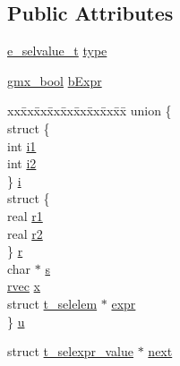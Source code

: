 \subsection*{\-Public \-Attributes}
\begin{DoxyCompactItemize}
\item 
\hyperlink{include_2selvalue_8h_a70b42b87d434580bf1493591857b8bec}{e\-\_\-selvalue\-\_\-t} \hyperlink{structt__selexpr__value_a04bb5634ea528c40b60aabdf39548897}{type}
\item 
\hyperlink{include_2types_2simple_8h_a8fddad319f226e856400d190198d5151}{gmx\-\_\-bool} \hyperlink{structt__selexpr__value_a9633665bd1927339d3fdf2dc119759d2}{b\-Expr}
\item 
\begin{tabbing}
xx\=xx\=xx\=xx\=xx\=xx\=xx\=xx\=xx\=\kill
union \{\\
\>struct \{\\
\>\>int \hyperlink{structt__selexpr__value_a9baf2eb4536a8ef57cc2de45acf1a490}{i1}\\
\>\>int \hyperlink{structt__selexpr__value_a90da0c62d5939089dfe14843e6703984}{i2}\\
\>\} \hyperlink{structt__selexpr__value_ac0a533beb7e085f510541083ec1ae8a7}{i}\\
\>struct \{\\
\>\>real \hyperlink{structt__selexpr__value_a48dc48f55a3c75e908d139dd49ae8b79}{r1}\\
\>\>real \hyperlink{structt__selexpr__value_a5db043b60415102189c3f4aa9881e634}{r2}\\
\>\} \hyperlink{structt__selexpr__value_a67746561a9938d082658967c371e3950}{r}\\
\>char $\ast$ \hyperlink{structt__selexpr__value_a4b5ef242753f905c05472be5cd80f2a9}{s}\\
\>\hyperlink{share_2template_2gromacs_2types_2simple_8h_aa02a552a4abd2f180c282a083dc3a999}{rvec} \hyperlink{structt__selexpr__value_a029f7f0c2e6e293387f6b287716a0c81}{x}\\
\>struct \hyperlink{structt__selelem}{t\_selelem} $\ast$ \hyperlink{structt__selexpr__value_a52e17a378d26bfc77f850aa9e233b396}{expr}\\
\} \hyperlink{structt__selexpr__value_ab67366fc205b4c84266d134a8189ca91}{u}\\

\end{tabbing}\item 
struct \hyperlink{structt__selexpr__value}{t\-\_\-selexpr\-\_\-value} $\ast$ \hyperlink{structt__selexpr__value_a6820b1e7fbf4c73d156bfdda0c713f8a}{next}
\end{DoxyCompactItemize}


